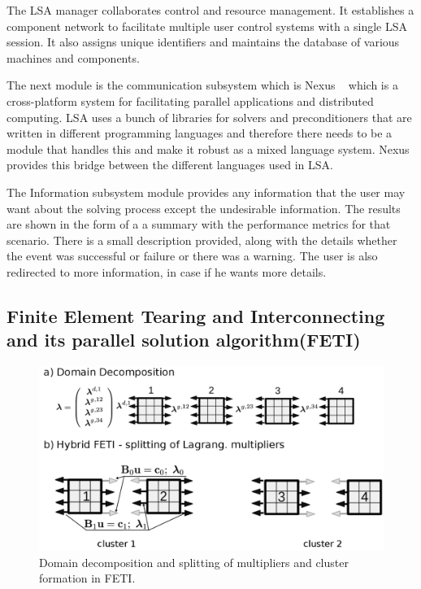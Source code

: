 The LSA manager collaborates control and resource management. It establishes a component network to facilitate multiple user control systems with a single LSA session. It also assigns unique identifiers and maintains the database of various machines and components.

The next module is the communication subsystem which is Nexus ~\cite{nexus} which is a cross-platform system for facilitating parallel applications and distributed computing. LSA uses a bunch of libraries for solvers and preconditioners that are written in different programming languages and therefore there needs to be a module that handles this and make it robust as a mixed language system. Nexus provides this bridge between the different languages used in LSA.

The Information subsystem module provides any information that the user may want about the solving process except the undesirable information. The results are shown in the form of a a summary with the performance metrics for that scenario. There is a small description provided, along with the details whether the event was successful or failure or there was a warning. The user is also redirected to more information, in case if he wants more details. 

\subsection{Finite Element Tearing and Interconnecting and its parallel solution algorithm(FETI)}

\begin{figure}[htp]
\begin{center}
 \includegraphics[width=0.9\linewidth]{figures/feti.png}
\end{center}
 \caption{Domain decomposition and splitting of multipliers and cluster formation in FETI.}
 \label{fig:feti}
\end{figure}

